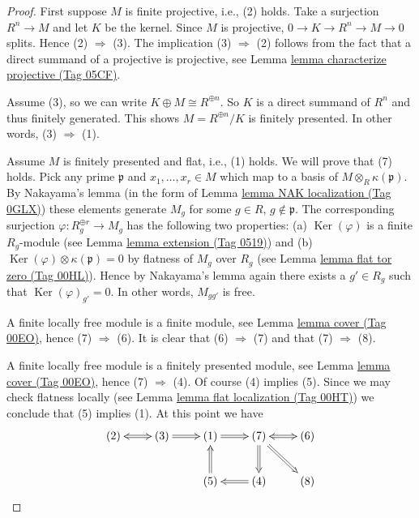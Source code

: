 \documentclass{amsart}
\theoremstyle{plain}
\theoremstyle{definition}
\theoremstyle{remark}
\numberwithin{equation}{subsection}
\def\Ker{\mathop{\mathrm{Ker}}}
\begin{document}
\begin{proof}
First suppose $M$ is finite projective, i.e., (2) holds.
Take a surjection $R^n \to M$ and let $K$ be the kernel.
Since $M$ is projective,
$0 \to K \to R^n \to M \to 0$ splits.
Hence (2) $\Rightarrow$ (3).
The implication (3) $\Rightarrow$ (2) follows from the fact that
a direct summand of a projective is projective, see
Lemma \href{https://stacks.math.columbia.edu/tag/05CF}{lemma characterize projective (Tag 05CF)}.

\medskip\noindent
Assume (3), so we can write $K \oplus M \cong R^{\oplus n}$.
So $K$ is a  direct summand of $R^n$ and thus finitely generated.
This shows $M = R^{\oplus n}/K$ is finitely presented.
In other words, (3) $\Rightarrow$ (1).

\medskip\noindent
Assume $M$ is finitely presented and flat, i.e., (1) holds.
We will prove that (7) holds. Pick any prime $\mathfrak p$ and
$x_1, \ldots, x_r \in M$ which map to a basis of
$M \otimes_R \kappa(\mathfrak p)$. By
Nakayama's lemma (in the form of Lemma \href{https://stacks.math.columbia.edu/tag/0GLX}{lemma NAK localization (Tag 0GLX)})
these elements generate $M_g$ for some $g \in R$, $g \not \in \mathfrak p$.
The corresponding surjection $\varphi : R_g^{\oplus r} \to M_g$
has the following two properties: (a) $\Ker(\varphi)$ is a finite
$R_g$-module (see Lemma \href{https://stacks.math.columbia.edu/tag/0519}{lemma extension (Tag 0519)})
and (b) $\Ker(\varphi) \otimes \kappa(\mathfrak p) = 0$
by flatness of $M_g$ over $R_g$ (see
Lemma \href{https://stacks.math.columbia.edu/tag/00HL}{lemma flat tor zero (Tag 00HL)}).
Hence by Nakayama's lemma again there exists a $g' \in R_g$ such that
$\Ker(\varphi)_{g'} = 0$. In other words, $M_{gg'}$ is free.

\medskip\noindent
A finite locally free module is a finite module, see
Lemma \href{https://stacks.math.columbia.edu/tag/00EO}{lemma cover (Tag 00EO)},
hence (7) $\Rightarrow$ (6).
It is clear that (6) $\Rightarrow$ (7) and that (7) $\Rightarrow$ (8).

\medskip\noindent
A finite locally free module is a finitely presented module, see
Lemma \href{https://stacks.math.columbia.edu/tag/00EO}{lemma cover (Tag 00EO)},
hence (7) $\Rightarrow$ (4).
Of course (4) implies (5).
Since we may check flatness locally (see
Lemma \href{https://stacks.math.columbia.edu/tag/00HT}{lemma flat localization (Tag 00HT)})
we conclude that (5) implies (1).
At this point we have
$$
\xymatrix{
(2) \ar@{<=>}[r] & (3) \ar@{=>}[r] & (1) \ar@{=>}[r] &
(7)  \ar@{<=>}[r] \ar@{=>}[rd] \ar@{=>}[d] & (6) \\
& & (5) \ar@{=>}[u] & (4) \ar@{=>}[l] & (8)
}
$$


\end{proof}
\end{document}
